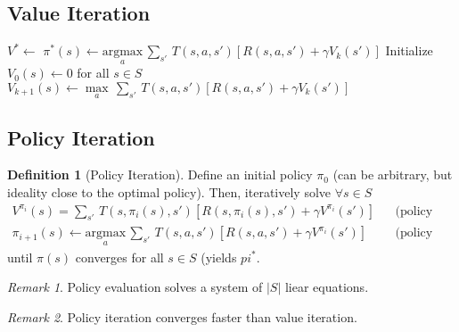 \documentclass[11pt]{article}
\theoremstyle{definition}
\newtheorem{definition}{Definition}[section]
\theoremstyle{remark}
\newtheorem*{remark}{Remark}
\begin{document}
\subsection{Value Iteration}
\begin{algorithm}
    \caption{Value Iteration}
    
    \DontPrintSemicolon
    
    \Fn{\Policy{}} {
    	$V^* \gets$ \Value{} 
    	 {
    	$\pi^*(s) \gets \underset{a}{\text{argmax}} \, \underset{s'}{\sum}\, T(s,a,s')[R(s,a,s')+\gamma V_k(s')]$
    	}
    }
    \Fn{\Value{}} {
    	Initialize $V_0(s) \gets 0$ for all $s \in S$ \\
    	 {
    		$V_{k+1}(s) \gets \underset{a}{\max} \, \underset{s'}{\sum} \, T(s,a,s')[R(s,a,s')+\gamma V_k(s')]$ \\
    	}
    }
\end{algorithm}

\subsection{Policy Iteration}
\begin{definition}[Policy Iteration]
Define an initial policy $\pi_0$ (can be arbitrary, but ideality close to the optimal policy). Then, iteratively solve $\forall s \in S$
\begin{align*}
V^{\pi_i}(s) = \underset{s'}{\sum} \, T(s,\pi_i(s),s')[R(s,\pi_i(s),s')+\gamma V^{\pi_i}(s')] && \text{(policy evaluation)} \\
\pi_{i+1}(s) \gets \underset{a}{\text{argmax}} \, \underset{s'}{\sum}\, T(s,a,s')[R(s,a,s')+\gamma V^{\pi_i}(s')] && \text{(policy improvement)}
\end{align*}
until $\pi(s)$ converges for all $s\in S$ (yields $pi^*$.
\end{definition}
\begin{remark}
Policy evaluation solves a system of $|S|$ liear equations.
\end{remark}
\begin{remark}
Policy iteration converges faster than value iteration.
\end{remark}
\end{document}
